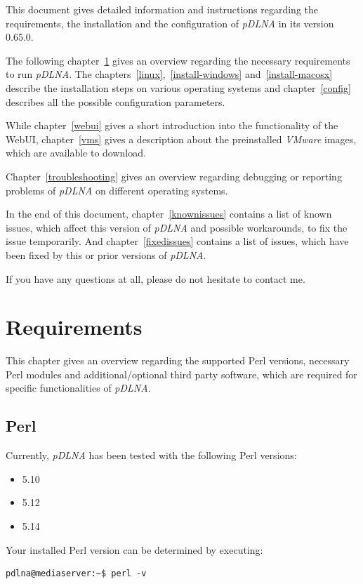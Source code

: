 \documentclass[a4paper,oneside,10pt]{report}
\newcommand{\pDLNAversion}{0.65.0}
\begin{document}
This document gives detailed information and instructions regarding the requirements, the installation and the configuration of {\em pDLNA} in its version \pDLNAversion.

The following chapter~\ref{require} gives an overview regarding the necessary requirements to run {\em pDLNA}. The chapters~\ref{linux},~\ref{install-windows} and~\ref{install-macosx} describe the installation steps on various operating systems and chapter~\ref{config} describes all the possible configuration parameters.

While chapter~\ref{webui} gives a short introduction into the functionality of the WebUI, chapter~\ref{vms} gives a description about the preinstalled {\em VMware} images, which are available to download.

Chapter~\ref{troubleshooting} gives an overview regarding debugging or reporting problems of {\em pDLNA} on different operating systems.

In the end of this document, chapter~\ref{knownissues} contains a list of known issues, which affect this version of {\em pDLNA} and possible workarounds, to fix the issue temporarily. And chapter~\ref{fixedissues} contains a list of issues, which have been fixed by this or prior versions of {\em pDLNA}.

If you have any questions at all, please do not hesitate to contact me.

%
%

\chapter{Requirements}
\label{require}

This chapter gives an overview regarding the supported Perl versions, necessary Perl modules and additional/optional third party software, which are required for specific functionalities of {\em pDLNA}.

\section{Perl}

Currently, {\em pDLNA} has been tested with the following Perl versions:
\begin{itemize}
	\item 5.10
	\item 5.12
	\item 5.14
\end{itemize}
Your installed Perl version can be determined by executing:
\begin{lstlisting}
pdlna@mediaserver:~$ perl -v
\end{lstlisting}
\end{document}
